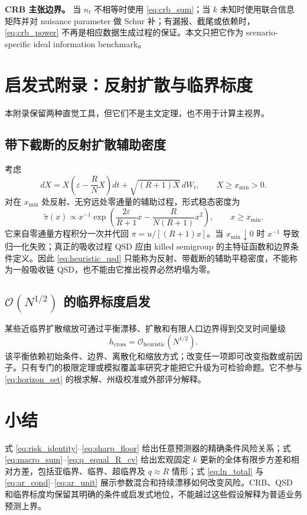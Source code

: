 \documentclass[11pt,a4paper]{article}
\theoremstyle{remark}
\begin{document}
\begin{notebox}
\textbf{CRB 主张边界。} 当 $n_t$ 不相等时使用 \eqref{eq:crb_sum}；当 $k$ 未知时使用联合信息矩阵并对 nuisance parameter 做 Schur 补；有漏报、截尾或依赖时，\eqref{eq:crb_power} 不再是相应数据生成过程的保证。本文只把它作为 scenario-specific ideal information benchmark。
\end{notebox}

\appendix
\section{启发式附录：反射扩散与临界标度}
本附录保留两种直觉工具，但它们不是主文定理，也不用于计算主视界。

\subsection{带下截断的反射扩散辅助密度}
考虑
\begin{equation}
dX=X\left(\varepsilon-\frac{R}{N}X\right)dt+\sqrt{(R+1)X}\,dW_t,
\qquad X\ge x_{\min}>0.
\end{equation}
对在 $x_{\min}$ 处反射、无穷远处零通量的辅助过程，形式稳态密度为
\begin{equation}
\widetilde\pi(x)\propto x^{-1}
\exp\left(\frac{2\varepsilon}{R+1}x-\frac{R}{N(R+1)}x^2\right),
\qquad x\ge x_{\min}.\label{eq:heuristic_qsd}
\end{equation}
它来自零通量方程积分一次并代回 $\pi=u/[(R+1)x]$。当 $x_{\min}\downarrow0$ 时 $x^{-1}$ 导致归一化失败；真正的吸收过程 QSD 应由 killed semigroup 的主特征函数和边界条件定义。因此 \eqref{eq:heuristic_qsd} 只能称为反射、带截断的辅助平稳密度，不能称为一般吸收链 QSD，也不能由它推出视界必然坍塌为零。

\subsection{\texorpdfstring{$\mathcal O(N^{1/2})$}{O(sqrt(N))} 的临界标度启发}
某些近临界扩散缩放可通过平衡漂移、扩散和有限人口边界得到交叉时间量级
\begin{equation}
h_{\mathrm{cross}}=\mathcal O_{\mathrm{heuristic}}(N^{1/2}).
\end{equation}
该平衡依赖初始条件、边界、离散化和缩放方式；改变任一项即可改变指数或前因子。只有专门的极限定理或模拟覆盖率研究才能把它升级为可检验命题。它不参与 \eqref{eq:horizon_set} 的根求解、州级校准或外部评分解释。

\section*{小结}
式 \eqref{eq:risk_identity}--\eqref{eq:sharp_floor} 给出任意预测器的精确条件风险关系；式 \eqref{eq:macro_sum}--\eqref{eq:q_equal_R_cv} 给出宏观固定 $k$ 更新的全体有限步方差和相对方差，包括亚临界、临界、超临界及 $q\approx R$ 情形；式 \eqref{eq:ln_total} 与 \eqref{eq:ar_cond}--\eqref{eq:ar_unit} 展示参数混合和持续漂移如何改变风险。CRB、QSD 和临界标度均保留其明确的条件或启发式地位，不能越过这些假设解释为普适业务预测上界。
\end{document}
